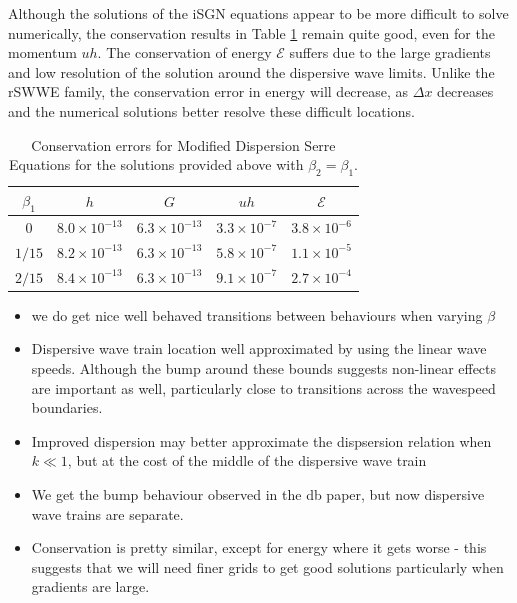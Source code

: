 \documentclass[10pt]{elsarticle}
\newcommand\T{\rule{0pt}{3ex }}       %
\begin{document}
Although the solutions of the iSGN equations appear to be more difficult to solve numerically, the conservation results in Table \ref{Tab:ImpDisp_Cons} remain quite good, even for the momentum $uh$. The conservation of energy $\mathcal{E}$ suffers due to the large gradients and low resolution of the solution around the dispersive wave limits. Unlike the rSWWE family, the conservation error in energy will decrease, as $\Delta x$ decreases and the numerical solutions better resolve these difficult locations.   
\begin{table}
	\centering
	\begin{tabular}{ c | c | c | c | c }
		$\beta_1$ & $h$ & $G$ & $uh$ & $\mathcal{E}$  \\
		\hline
		\T $0$ &	$8.0 \times 10^{-13}$ & $6.3 \times 10^{-13}$  & $3.3 \times 10^{-7}$ &	 $3.8 \times 10^{-6}$ \\
		\T${1}/{15}$ & $8.2 \times 10^{-13}$ &	$6.3 \times 10^{-13}$ & $5.8 \times 10^{-7}$	 &	$1.1 \times 10^{-5}$ \\
		\T${2}/{15}$ & $8.4 \times 10^{-13}$ &	$6.3 \times 10^{-13}$ & $9.1 \times 10^{-7}$	 &	$2.7 \times 10^{-4}$ \\
	\end{tabular}
	\caption{Conservation errors for Modified Dispersion Serre Equations for the solutions provided above with $\beta_2 = \beta_1 $.}
	\label{Tab:ImpDisp_Cons}
\end{table}
%

\begin{itemize}
	\item we do get nice well behaved transitions between behaviours when varying $\beta$
	\item Dispersive wave train location well approximated by using the linear wave speeds. Although the bump around these bounds suggests non-linear effects are important as well, particularly close to transitions across the wavespeed boundaries. 
	\item Improved dispersion may better approximate the dispsersion relation when $k\ll 1$, but at the cost of the middle of the dispersive wave train
	\item We get the bump behaviour observed in the db paper, but now dispersive wave trains are separate.
	\item Conservation is pretty similar, except for energy where it gets worse - this suggests that we will need finer grids to get good solutions particularly when gradients are large.
\end{itemize}
\end{document}
